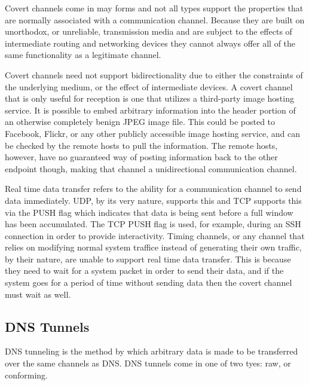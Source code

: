 \documentclass{article}
\theoremstyle{remark}
\theoremstyle{definition}
\theoremstyle{definition}
\theoremstyle{definition}
\begin{document}
Covert channels come in may forms and not all types support the properties that
are normally associated with a communication channel. Because they are built on
unorthodox, or unreliable, transmission media and are subject to the effects of
intermediate routing and networking devices they cannot always offer all of the
same functionality as a legitimate channel.

Covert channels need not support bidirectionality due
to either the constraints of the underlying medium, or the effect of
intermediate devices. A covert channel that is only useful for reception is one
that utilizes a third-party image hosting service. It is possible to embed
arbitrary information into the header portion of an otherwise completely benign
JPEG image file. This could be posted to Facebook, Flickr, or any other
publicly accessible image hosting service, and can be checked by the remote
hosts to pull the information. The remote hosts, however, have no guaranteed
way of posting information back to the other endpoint though, making that
channel a unidirectional communication channel.

Real time data transfer refers to the ability
for a communication channel to send data immediately. UDP, by its very nature,
supports this and TCP supports this via the PUSH flag which indicates that data
is being sent before a full window has been accumulated. The TCP PUSH flag
is used, for example, during an SSH connection in order to provide
interactivity. Timing channels, or any channel that relies on modifying normal
system traffice instead of generating their own traffic, by their nature, are
unable to support real time data transfer. This is because they need to wait for
a system packet in order to send their data, and if the system goes for a period
of time without sending data then the covert channel must wait as well.

\subsection{DNS Tunnels}

DNS tunneling is the method by which arbitrary data is made to be transferred
over the same channels as DNS. DNS tunnels come in one of two tyes: raw, or
conforming.
\end{document}
